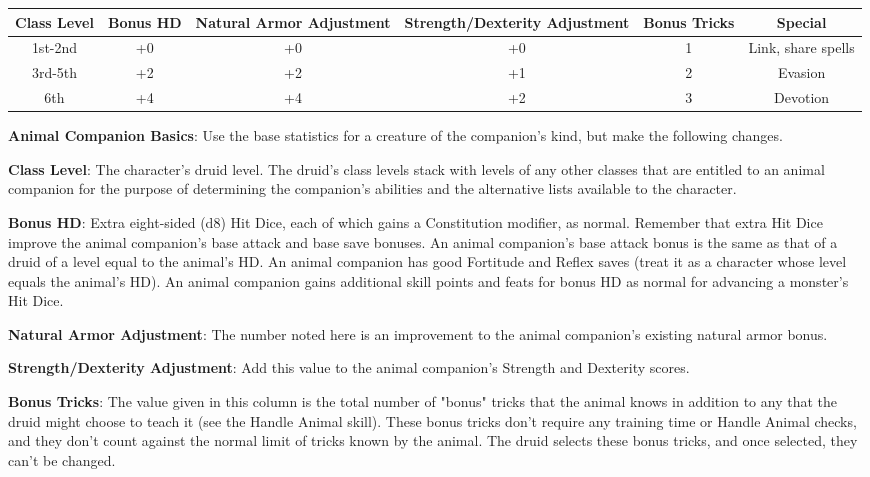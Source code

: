 \begin{center}
\begin{adjustwidth}{-4cm}{}
\begin{small}
\begin{tabular}{| c | c | c | c | c | c |}
\hline
Class Level &Bonus HD &Natural Armor Adjustment &Strength/Dexterity Adjustment &Bonus Tricks &Special \\
\hline
1st-2nd &+0 &+0 &+0 &1 &Link, share spells \\
3rd-5th &+2 &+2 &+1 &2 &Evasion \\
6th &+4 &+4 &+2 &3 &Devotion \\
\hline
\end{tabular}
\end{small}
\end{adjustwidth}
\end{center}
 
\textbf{Animal Companion Basics}: Use the base statistics for a creature of the companion’s kind, but make the following changes.

\textbf{Class Level}: The character’s druid level. The druid’s class levels stack with levels of any other classes that are entitled to an animal companion for the purpose of determining the companion’s abilities and the alternative lists available to the character.

\textbf{Bonus HD}: Extra eight-sided (d8) Hit Dice, each of which gains a Constitution modifier, as normal. Remember that extra Hit Dice improve the animal companion’s base attack and base save bonuses. An animal companion’s base attack bonus is the same as that of a druid of a level equal to the animal’s HD. An animal companion has good Fortitude and Reflex saves (treat it as a character whose level equals the animal’s HD). An animal companion gains additional skill points and feats for bonus HD as normal for advancing a monster’s Hit Dice.

\textbf{Natural Armor Adjustment}: The number noted here is an improvement to the animal companion’s existing natural armor bonus.

\textbf{Strength/Dexterity Adjustment}: Add this value to the animal companion’s Strength and Dexterity scores.

\textbf{Bonus Tricks}: The value given in this column is the total number of "bonus" tricks that the animal knows in addition to any that the druid might choose to teach it (see the Handle Animal skill). These bonus tricks don’t require any training time or Handle Animal checks, and they don’t count against the normal limit of tricks known by the animal. The druid selects these bonus tricks, and once selected, they can’t be changed.

